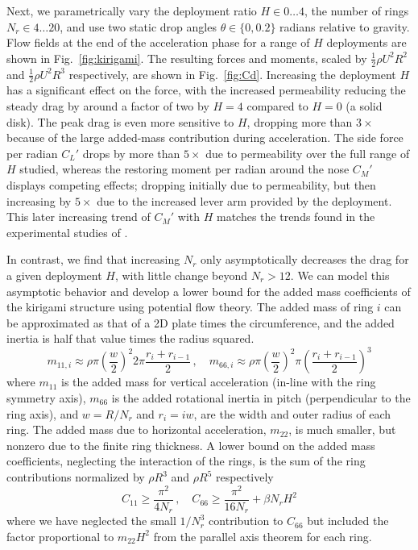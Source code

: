 \documentclass[lineno]{JFM-FLM_Au}
\begin{document}
Next, we parametrically vary the deployment ratio $H \in 0\ldots 4$, the number of rings $N_r \in 4\ldots20$, and use two static drop angles $\theta \in \{0,0.2\}$ radians relative to gravity. Flow fields at the end of the acceleration phase for a range of $H$ deployments are shown in Fig.~\ref{fig:kirigami}. The resulting forces and moments, scaled by $\frac 12 \rho U^2 R^2$ and $\frac 12 \rho U^2 R^3$ respectively, are shown in Fig.~\ref{fig:Cd}. Increasing the deployment $H$ has a significant effect on the force, with the increased permeability reducing the steady drag by around a factor of two by $H=4$ compared to $H=0$ (a solid disk). The peak drag is even more sensitive to $H$, dropping more than $3\times$ because of the large added-mass contribution during acceleration. The side force per radian $C_L'$ drops by more than $5\times$ due to permeability over the full range of $H$ studied, whereas the restoring moment per radian around the nose $C_M'$ displays competing effects; dropping initially due to permeability, but then increasing by $5\times$ due to the increased lever arm provided by the deployment. This later increasing trend of $C_M'$ with $H$ matches the trends found in the experimental studies of \cite{Lamoureux2025Kirigami-inspiredReconfiguration}.

In contrast, we find that increasing $N_r$ only asymptotically decreases the drag for a given deployment $H$, with little change beyond $N_r>12$. We can model this asymptotic behavior and develop a lower bound for the added mass coefficients of the kirigami structure using potential flow theory. The added mass of ring $i$ can be approximated as that of a 2D plate times the circumference, and the added inertia is half that value times the radius squared.
\begin{equation}
    m_{11,i} \approx \rho \pi\left(\frac w 2\right)^2 2\pi \frac{r_i+r_{i-1}}2\,,\quad  m_{66,i} \approx \rho \pi\left(\frac w 2\right)^2 \pi \left(\frac{r_i+r_{i-1}}2\right)^3
\end{equation}
where $m_{11}$ is the added mass for vertical acceleration (in-line with the ring symmetry axis), $m_{66}$ is the added rotational inertia in pitch (perpendicular to the ring axis), and $w = R/N_r$ and $r_i=iw$, are the width and outer radius of each ring. The added mass due to horizontal acceleration, $m_{22}$, is much smaller, but nonzero due to the finite ring thickness.
A lower bound on the added mass coefficients, neglecting the interaction of the rings,  is the sum of the ring contributions normalized by $\rho R^3$ and $\rho R^5$ respectively
\begin{equation}\label{eq:C11_C66}
    C_{11} \ge \frac{\pi^2}{4N_r}\,,\quad C_{66} \ge \frac {\pi^2} {16N_r} + \beta N_r H^2
\end{equation}
where we have neglected the small $1/N_r^3$ contribution to $C_{66}$ but included the factor proportional to $m_{22}H^2$ from the parallel axis theorem for each ring.
\end{document}
